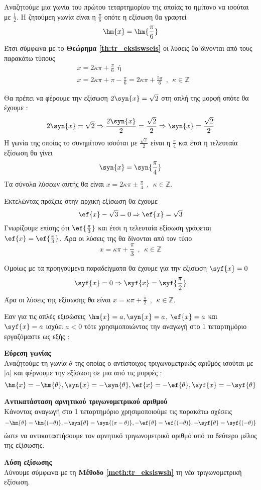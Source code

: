 \begin{rlist}
\item Αναζητούμε μια γωνία του πρώτου τεταρτημορίου της οποίας το ημίτονο να ισούται με $ \frac{1}{2} $. Η ζητούμεη γωνία είναι η $ \frac{\pi}{6} $ οπότε η εξίσωση θα γραφτεί
\[ \hm{x}=\hm{\frac{\pi}{6}} \]
Έτσι σύμφωνα με το \textbf{Θεώρημα \ref{th:tr_eksiswseis}} οι λύσεις θα δίνονται από τους παρακάτω τύπους
\begin{align*}
&x=2\kappa\pi+\frac{\pi}{6}\ \ \textrm{ή}\\ &x=2\kappa\pi+\pi-\frac{\pi}{6}=2\kappa\pi+\frac{5\pi}{6} \ \ ,\ \ \kappa\in\mathbb{Z}
\end{align*}
\item Θα πρέπει να φέρουμε την εξίσωση $ 2\syn{x}=\sqrt{2} $ στη απλή της μορφή οπότε θα έχουμε :
\[ 2\syn{x}=\sqrt{2}\Rightarrow \frac{2\syn{x}}{2}=\frac{\sqrt{2}}{2}\Rightarrow\syn{x}=\frac{\sqrt{2}}{2} \]
Η γωνία της οποίας το συνημίτονο ισούται με $ \frac{\sqrt{2}}{2} $ είναι η $ \frac{\pi}{4} $ και έτσι η τελευταία εξίσωση θα γίνει
\[ \syn{x}=\syn{\frac{\pi}{4}} \]
Τα σύνολα λύσεων αυτής θα είναι $ x=2\kappa\pi\pm\frac{\pi}{4} \ \ ,\ \ \kappa\in\mathbb{Z}$.
\item Εκτελώντας πράξεις στην αρχική εξίσωση θα έχουμε
\[ \ef{x}-\sqrt{3}=0\Rightarrow\ef{x}=\sqrt{3} \]
Γνωρίζουμε επίσης ότι $ \ef{\frac{\pi}{3}} $ και έτσι η τελευταία εξίσωση γράφεται $ \ef{x}=\ef{\frac{\pi}{3}} $. Άρα οι λύσεις της θα δίνονται από τον τύπο
\[ x=\kappa\pi+\frac{\pi}{3} \ \ ,\ \ \kappa\in\mathbb{Z}\]
\item Ομοίως με τα προηγούμενα παραδείγματα θα έχουμε για την εξίσωση $ \syf{x}=0 $
\[ \syf{x}=0\Rightarrow\syf{x}=\syf{\frac{\pi}{2}} \]
Άρα οι λύσεις της εξίσωσης θα είναι
$ x=\kappa\pi+\frac{\pi}{2} \ \ ,\ \ \kappa\in\mathbb{Z} $.
\end{rlist}
\begin{Methodos}{1cm}
Εαν για τις απλές εξισώσεις $ \hm{x}=a, \syn{x}=a$, $ \ef{x}=a $ και $ \syf{x}=a $ ισχύει $ a<0 $ τότε χρησιμοποιώντας την αναγωγή στο 1 τεταρτημόριο εργαζόμαστε ως εξής :
\begin{bhma}
\item \textbf{Εύρεση γωνίας}\\
Αναζητούμε τη γωνία $ \theta $ της οποίας ο αντίστοιχος τριγωνομετρικός αριθμός ισούται με $ |a| $ και φέρνουμε την εξίσωση σε μια από τις μορφές :
\[ \hm{x}=-\hm{\theta}, \syn{x}=-\syn{\theta},\ef{x}=-\ef{\theta}, \syf{x}=-\syf{\theta} \]
\item \textbf{Αντικατάσταση αρνητικού τριγωνομετρικού αριθμού}\\
Κάνοντας αναγωγή στο 1 τεταρτημόριο χρησιμοποιούμε τις παρακάτω σχέσεις
\[ -\hm{\theta}=\hm{(-\theta)}, -\syn{\theta}=\syn{(\pi-\theta)},-\ef{\theta}=\ef{(-\theta)}, -\syf{\theta}=\syf{(-\theta)} \]
ώστε να αντικαταστήσουμε τον αρνητικό τριγωνομετρικό αριθμό από το δεύτερο μέλος της εξίσωσης.
\item \textbf{Λύση εξίσωσης}\\
Λύνουμε σύμφωνα με τη \textbf{Μέθοδο \ref{meth:tr_eksiswsh}} τη νέα τριγωνομετρική εξίσωση.
\end{bhma}
\end{Methodos}
